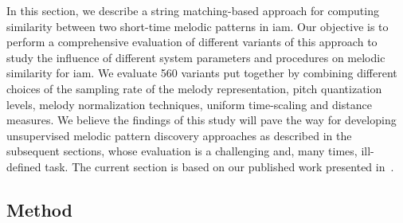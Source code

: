 


In this section, we describe a string matching-based approach for computing similarity between two short-time melodic patterns in \gls{iam}. Our objective is to perform a comprehensive evaluation of different variants of this approach to study the influence of different system parameters and procedures on melodic similarity for \gls{iam}. We evaluate 560 variants put together by combining different choices of the sampling rate of the melody representation, pitch quantization levels, melody normalization techniques, uniform time-scaling and distance measures. We believe the findings of this study will pave the way for developing unsupervised melodic pattern discovery approaches as described in the subsequent sections, whose evaluation is a challenging and, many times, ill-defined task. The current section is based on our published work presented in~\cite{gulati_ICASSP2015}.

\subsection{Method}
\label{sec:method_similarity_evaluation}



